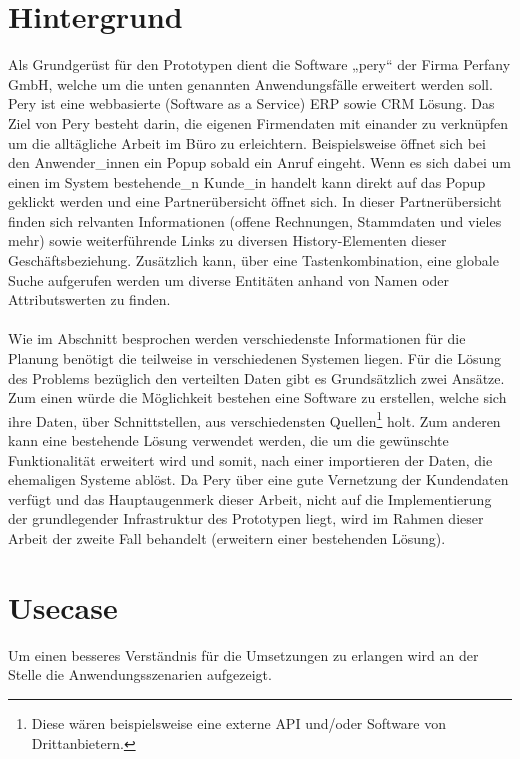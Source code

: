 \documentclass[Bachelorarbeit.tex]{subfiles}
\begin{document}
\section{Hintergrund}
\label{chap:einfuehrung:sec:hintergrund}
Als Grundgerüst für den Prototypen dient die Software „pery“ der Firma Perfany GmbH, welche um die unten genannten Anwendungsfälle erweitert werden soll. 
Pery ist eine webbasierte (Software as a Service) \ac{ERP} sowie \ac{CRM} Lösung.
Das Ziel von Pery besteht darin, die eigenen Firmendaten mit einander zu verknüpfen um die alltägliche Arbeit im Büro zu erleichtern.
Beispielsweise öffnet sich bei den Anwender\_innen ein Popup sobald ein Anruf eingeht. 
Wenn es sich dabei um einen im System bestehende\_n Kunde\_in handelt kann direkt auf das Popup geklickt werden und eine Partnerübersicht öffnet sich.
In dieser Partnerübersicht finden sich relvanten Informationen (offene Rechnungen, Stammdaten und vieles mehr) sowie weiterführende Links zu diversen History-Elementen dieser Geschäftsbeziehung.
Zusätzlich kann, über eine Tastenkombination, eine globale Suche aufgerufen werden um diverse Entitäten anhand von Namen oder Attributswerten zu finden. \\
\\
Wie im Abschnitt  besprochen werden verschiedenste Informationen für die Planung benötigt die teilweise in verschiedenen Systemen liegen. 
Für die Lösung des Problems bezüglich den verteilten Daten gibt es Grundsätzlich zwei Ansätze.
Zum einen würde die Möglichkeit bestehen eine Software zu erstellen, welche sich ihre Daten, über Schnittstellen, aus verschiedensten Quellen\footnote{Diese wären beispielsweise eine externe \ac{API} und/oder Software von Drittanbietern.} holt.
Zum anderen kann eine bestehende Lösung verwendet werden, die um die gewünschte Funktionalität erweitert wird und somit, nach einer importieren der Daten, die ehemaligen Systeme ablöst. 
Da Pery über eine gute Vernetzung der Kundendaten verfügt und das Hauptaugenmerk dieser Arbeit, nicht auf die Implementierung der grundlegender Infrastruktur des Prototypen liegt, wird im Rahmen dieser Arbeit der zweite Fall behandelt (erweitern einer bestehenden Lösung).

 

\section{Usecase}

Um einen besseres Verständnis für die Umsetzungen zu erlangen wird an der Stelle die Anwendungsszenarien aufgezeigt.
\end{document}
